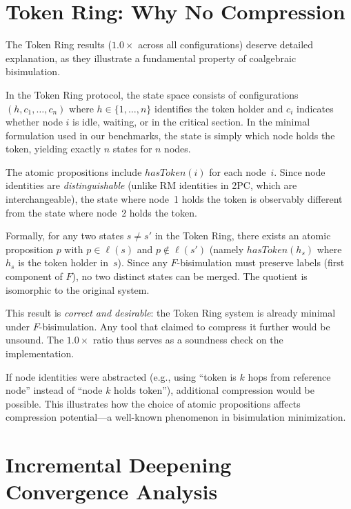 \documentclass[11pt]{article}
\begin{document}
\section{Token Ring: Why No Compression}
\label{app:tokenring}

The Token Ring results ($1.0\times$ across all configurations) deserve
detailed explanation, as they illustrate a fundamental property of
coalgebraic bisimulation.

In the Token Ring protocol, the state space consists of configurations
$(h, c_1, \ldots, c_n)$ where $h \in \{1, \ldots, n\}$ identifies the
token holder and $c_i$ indicates whether node $i$ is idle, waiting, or
in the critical section.
In the minimal formulation used in our benchmarks, the state is simply
which node holds the token, yielding exactly $n$ states for $n$ nodes.

The atomic propositions include $\mathit{hasToken}(i)$ for each node~$i$.
Since node identities are \emph{distinguishable} (unlike RM identities in
2PC, which are interchangeable), the state where node~1 holds the token
is observably different from the state where node~2 holds the token.

Formally, for any two states $s \neq s'$ in the Token Ring, there exists
an atomic proposition $p$ with $p \in \ell(s)$ and $p \notin \ell(s')$
(namely $\mathit{hasToken}(h_s)$ where $h_s$ is the token holder in~$s$).
Since any $F$-bisimulation must preserve labels (first component of $F$),
no two distinct states can be merged.
The quotient is isomorphic to the original system.

This result is \emph{correct and desirable}: the Token Ring system is
already minimal under $F$-bisimulation.
Any tool that claimed to compress it further would be unsound.
The $1.0\times$ ratio thus serves as a soundness check on the
implementation.

If node identities were abstracted (e.g., using ``token is $k$ hops
from reference node'' instead of ``node $k$ holds token''), additional
compression would be possible.
This illustrates how the choice of atomic propositions affects compression
potential---a well-known phenomenon in bisimulation minimization.


\section{Incremental Deepening Convergence Analysis}
\label{app:deepening}
\end{document}
